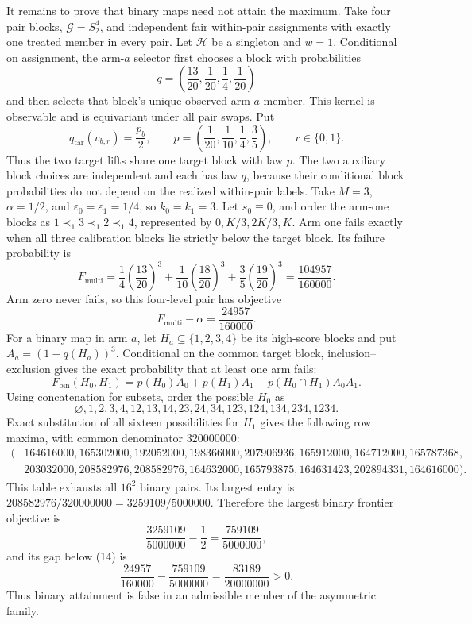 It remains to prove that binary maps need not attain the maximum. Take four pair blocks, \(\mathcal G=S_2^4\), and independent fair within-pair assignments with exactly one treated member in every pair. Let \(\mathcal H\) be a singleton and \(w=1\). Conditional on assignment, the arm-\(a\) selector first chooses a block with probabilities
\[
q=\left(\frac{13}{20},\frac1{20},\frac14,\frac1{20}\right)
\tag{11}
\]
and then selects that block's unique observed arm-\(a\) member. This kernel is observable and is equivariant under all pair swaps. Put
\[
q_{\mathrm{tar}}(v_{b,r})=\frac{p_b}{2},
\qquad
p=\left(\frac1{20},\frac1{10},\frac14,\frac35\right),
\qquad r\in\{0,1\}.
\tag{12}
\]
Thus the two target lifts share one target block with law \(p\). The two auxiliary block choices are independent and each has law \(q\), because their conditional block probabilities do not depend on the realized within-pair labels. Take \(M=3\), \(\alpha=1/2\), and \(\varepsilon_0=\varepsilon_1=1/4\), so \(k_0=k_1=3\). Let \(s_0\equiv0\), and order the arm-one blocks as \(1\prec_1 3\prec_1 2\prec_1 4\), represented by \(0,K/3,2K/3,K\). Arm one fails exactly when all three calibration blocks lie strictly below the target block. Its failure probability is
\[
F_{\mathrm{multi}}=\frac14\left(\frac{13}{20}\right)^3+\frac1{10}\left(\frac{18}{20}\right)^3+\frac35\left(\frac{19}{20}\right)^3=\frac{104957}{160000}.
\tag{13}
\]
Arm zero never fails, so this four-level pair has objective
\[
F_{\mathrm{multi}}-\alpha=\frac{24957}{160000}.
\tag{14}
\]
For a binary map in arm \(a\), let \(H_a\subseteq\{1,2,3,4\}\) be its high-score blocks and put \(A_a=(1-q(H_a))^3\). Conditional on the common target block, inclusion--exclusion gives the exact probability that at least one arm fails:
\[
F_{\mathrm{bin}}(H_0,H_1)=p(H_0)A_0+p(H_1)A_1-p(H_0\cap H_1)A_0A_1.
\tag{15}
\]
Using concatenation for subsets, order the possible \(H_0\) as
\[
\varnothing,1,2,3,4,12,13,14,23,24,34,123,124,134,234,1234.
\]
Exact substitution of all sixteen possibilities for \(H_1\) gives the following row maxima, with common denominator \(320000000\):
\[
\begin{split}
(&164616000,165302000,192052000,198366000,207906936,165912000,164712000,165787368,\\
&203032000,208582976,208582976,164632000,165793875,164631423,202894331,164616000).
\end{split}
\tag{16}
\]
This table exhausts all \(16^2\) binary pairs. Its largest entry is \(208582976/320000000=3259109/5000000\). Therefore the largest binary frontier objective is
\[
\frac{3259109}{5000000}-\frac12=\frac{759109}{5000000},
\]
and its gap below (14) is
\[
\frac{24957}{160000}-\frac{759109}{5000000}=\frac{83189}{20000000}>0.
\tag{17}
\]
Thus binary attainment is false in an admissible member of the asymmetric family.

